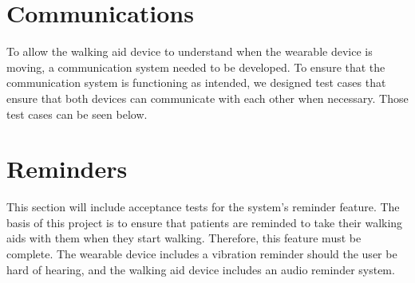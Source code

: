         \vspace{4em}
        

        \vspace{4em}
        

    \section{Communications}
    \label{sec:test_comms}

        To allow the walking aid device to understand when the wearable device is moving, a communication system needed to be developed. To ensure that the communication system is functioning as intended, we designed test cases that ensure that both devices can communicate with each other when necessary. Those test cases can be seen below.

        \vspace{1em}
        

        \vspace{4em}
        

        \vspace{4em}
        

        \vspace{4em}
        

    \section{Reminders}
    \label{sec:test_reminders}

        This section will include acceptance tests for the system's reminder feature. The basis of this project is to ensure that patients are reminded to take their walking aids with them when they start walking. Therefore, this feature must be complete. The wearable device includes a vibration reminder should the user be hard of hearing, and the walking aid device includes an audio reminder system.

        \vspace{1em}
        

        \vspace{4em}
        